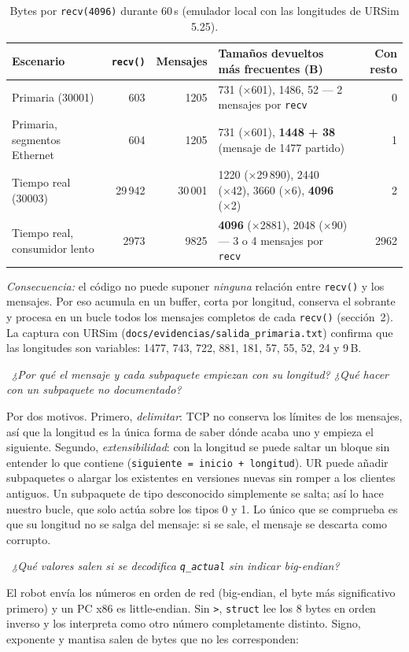\documentclass[10pt,a4paper]{article}
\newcommand{\code}[1]{\texttt{\small #1}}
\newcommand{\preg}[2]{\par\smallskip\noindent{\color{azul}\bfseries P#1.}~{\itshape #2}\par\nopagebreak}
\begin{document}
\begin{table}[h]
\centering\small
\caption{Bytes por \code{recv(4096)} durante 60\,s (emulador local con las longitudes de URSim 5.25).}\label{tab:recv}
\footnotesize
\begin{tabularx}{\linewidth}{@{}l r r X r@{}}
\toprule
Escenario & \code{recv()} & Mensajes & Tamaños devueltos más frecuentes (B) & Con resto \\ \midrule
Primaria (30001) & 603 & 1205 & 731 (×601), 1486, 52 — 2 mensajes por \code{recv} & 0 \\
Primaria, segmentos Ethernet & 604 & 1205 & 731 (×601), \textbf{1448 + 38} (mensaje de 1477 partido) & 1 \\
Tiempo real (30003) & 29\,942 & 30\,001 & 1220 (×29\,890), 2440 (×42), 3660 (×6), \textbf{4096} (×2) & 2 \\
Tiempo real, consumidor lento & 2973 & 9825 & \textbf{4096} (×2881), 2048 (×90) — 3 o 4 mensajes por \code{recv} & 2962 \\ \bottomrule
\end{tabularx}
\end{table}

\vspace{-4pt}
\emph{Consecuencia:} el código no puede suponer \emph{ninguna} relación entre \code{recv()} y los mensajes. Por eso acumula en un buffer, corta por longitud, conserva el sobrante y procesa en un bucle todos los mensajes completos de cada \code{recv()} (sección~2). La captura con URSim (\code{docs/evidencias/salida\_primaria.txt}) confirma que las longitudes son variables: 1477, 743, 722, 881, 181, 57, 55, 52, 24 y 9\,B.

\preg{2}{¿Por qué el mensaje y cada subpaquete empiezan con su longitud? ¿Qué hacer con un subpaquete no documentado?}
Por dos motivos. Primero, \emph{delimitar}: TCP no conserva los límites de los mensajes, así que la longitud es la única forma de saber dónde acaba uno y empieza el siguiente. Segundo, \emph{extensibilidad}: con la longitud se puede saltar un bloque sin entender lo que contiene (\code{siguiente = inicio + longitud}). UR puede añadir subpaquetes o alargar los existentes en versiones nuevas sin romper a los clientes antiguos. Un subpaquete de tipo desconocido simplemente se salta; así lo hace nuestro bucle, que solo actúa sobre los tipos 0 y 1. Lo único que se comprueba es que su longitud no se salga del mensaje: si se sale, el mensaje se descarta como corrupto.

\preg{3}{¿Qué valores salen si se decodifica \code{q\_actual} sin indicar big-endian?}
El robot envía los números en orden de red (big-endian, el byte más significativo primero) y un PC x86 es little-endian. Sin \code{>}, \code{struct} lee los 8 bytes en orden inverso y los interpreta como otro número completamente distinto. Signo, exponente y mantisa salen de bytes que no les corresponden:
\end{document}
